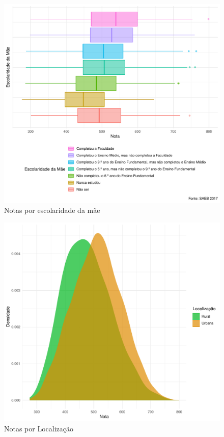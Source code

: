 \newpage
\begin{figure}[h]
    \caption{Notas por escolaridade da mãe}
    \includegraphics[width=16cm]{img/esc_mae_notas.pdf}
\end{figure}

\newpage
\begin{figure}[h]
    \caption{Notas por Localização}
    \includegraphics[width=18cm]{img/loc_notas.pdf}
\end{figure}


